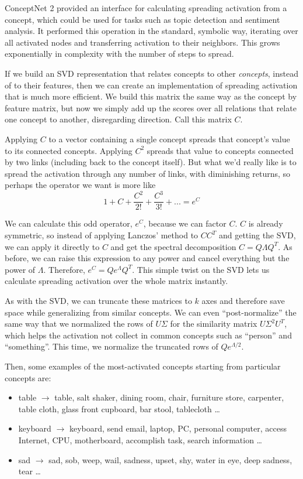 \documentclass[11pt]{article}
\newenvironment{mylist}{
\begin{itemize}
  \setlength{\itemsep}{1pt}
  \setlength{\parskip}{0pt}
  \setlength{\parsep}{0pt}}{\end{itemize}
}
\begin{document}
ConceptNet 2 provided an interface for calculating spreading activation from a concept, which could be used for tasks
such as topic detection and sentiment analysis. It performed this operation in the standard, symbolic way, iterating over all activated nodes and transferring activation to their neighbors. This grows exponentially in complexity with the number of steps to spread.

If we build an SVD representation that relates concepts to other {\em concepts}, instead of to their features, then we can create an implementation of spreading activation that is much more efficient. We build this matrix the same way as the concept by feature matrix, but now we simply add up the scores over all relations that relate one concept to another, disregarding direction. Call this matrix $C$.

Applying $C$ to a vector containing a single concept spreads that concept's value to its connected concepts. Applying $C^2$ spreads that value to concepts connected by two links (including back to the concept itself). But what we'd really like is to spread the activation through any number of links, with diminishing returns, so perhaps the operator we want is more like
$$1 + C + \frac{C^2}{2!} + \frac{C^3}{3!} + ... = e^C$$

We can calculate this odd operator, $e^C$, because we can factor $C$. $C$ is already symmetric, so instead of applying Lanczos' method to $CC^T$ and getting the SVD, we can apply it directly to $C$ and get the spectral decomposition $C = Q\Lambda Q^T$. As before, we can raise this expression to any power and cancel everything but the power of $\Lambda$. Therefore, $e^C = Qe^\Lambda Q^T$. This simple twist on the SVD lets us calculate spreading activation over the whole matrix instantly.

As with the SVD, we can truncate these matrices to $k$ axes and therefore save space while generalizing from similar concepts. We can even ``post-normalize'' the same way that we normalized the rows of $U\Sigma$ for the similarity matrix $U\Sigma^2U^T$, which helps the activation not collect in common concepts such as ``person'' and ``something''. This time, we normalize the truncated rows of $Qe^{\Lambda/2}$.

Then, some examples of the most-activated concepts starting from particular concepts are:
\begin{mylist}
\item table $\rightarrow$ table, salt shaker, dining room, chair, furniture store, carpenter, table cloth, glass front cupboard, bar stool, tablecloth \ldots
\item keyboard $\rightarrow$ keyboard, send email, laptop, PC, personal computer, access Internet, CPU, motherboard, accomplish task, search information \ldots
\item sad $\rightarrow$ sad, sob, weep, wail, sadness, upset, shy, water in eye, deep sadness, tear \ldots
\end{mylist}
\end{document}
